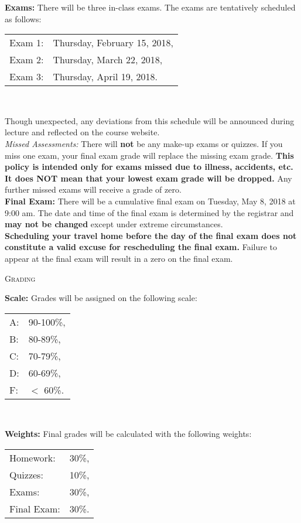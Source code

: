 \documentclass[teaching.portfolio.tex]{subfiles}
\begin{document}
\noindent\textbf{Exams:}
There will be three in-class exams.
The exams are tentatively scheduled as follows:
\begin{center}
  \begin{tabular}{ll}
    Exam 1: & Thursday, February 15, 2018,\\
    Exam 2: & Thursday, March 22, 2018,\\
    Exam 3: & Thursday, April 19, 2018.\\
  \end{tabular}\\
\end{center}
Though unexpected, any deviations from this schedule will be announced during lecture and reflected on the course website.\\

\noindent\textit{Missed Assessments:}
There will {\bf not} be any make-up exams or quizzes.
If you miss one exam, your final exam grade will replace the missing exam grade.
\textbf{This policy is intended only for exams missed due to illness, accidents, etc.  
  It does NOT mean that your lowest exam grade will be dropped.}
Any further missed exams will receive a grade of zero.\\

\noindent\textbf{Final Exam:} There will be a cumulative final exam on Tuesday, May 8, 2018 at 9:00 am.
The date and time of the final exam is determined by the registrar and \textbf{may not be changed} except under extreme circumstances.\\

\textbf{Scheduling your travel home before the day of the final exam does not constitute a valid excuse for rescheduling the final exam.}
Failure to appear at the final exam will result in a zero on the final exam.

\begin{center}
  \textsc{Grading}
\end{center}
\textbf{Scale:}
Grades will be assigned on the following scale:
\begin{center}
  \begin{tabular}{ll}
    A: &90-100\%,\\
    B: & 80-89\%,\\
    C: & 70-79\%,\\
    D: & 60-69\%,\\
    F: & $<$ 60\%.\\
  \end{tabular}\\
\end{center}
\textbf{Weights:}
Final grades will be calculated with the following weights:
\begin{center}
  \begin{tabular}{lr}
    Homework: & 30\%,\\
    Quizzes: &10\%,\\
    Exams: & 30\%,\\
    Final Exam: & 30\%.\\
  \end{tabular}\\
\end{center}
\end{document}
